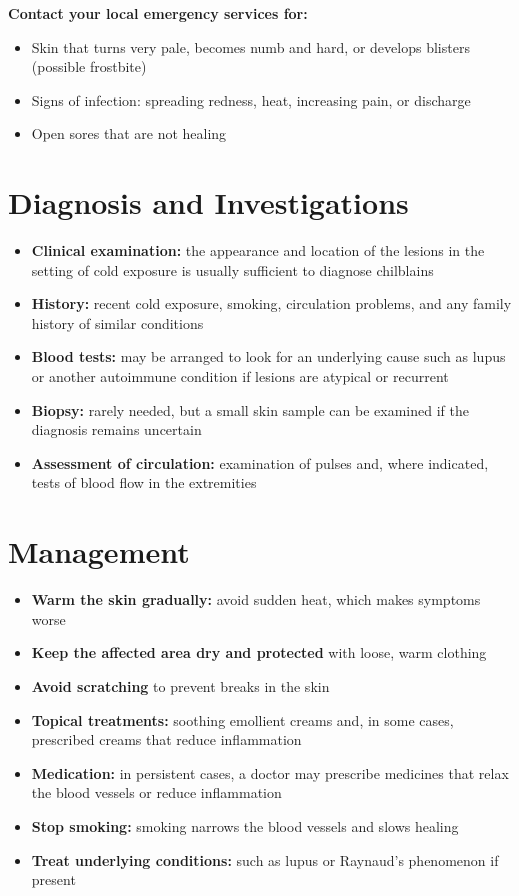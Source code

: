 \medskip
\textbf{Contact your local emergency services for:}
\begin{itemize}
    \item Skin that turns very pale, becomes numb and hard, or develops blisters (possible frostbite)
    \item Signs of infection: spreading redness, heat, increasing pain, or discharge
    \item Open sores that are not healing
\end{itemize}

\section*{Diagnosis and Investigations}
\begin{itemize}
    \item \textbf{Clinical examination:} the appearance and location of the lesions in the setting of cold exposure is usually sufficient to diagnose chilblains
    \item \textbf{History:} recent cold exposure, smoking, circulation problems, and any family history of similar conditions
    \item \textbf{Blood tests:} may be arranged to look for an underlying cause such as lupus or another autoimmune condition if lesions are atypical or recurrent
    \item \textbf{Biopsy:} rarely needed, but a small skin sample can be examined if the diagnosis remains uncertain
    \item \textbf{Assessment of circulation:} examination of pulses and, where indicated, tests of blood flow in the extremities
\end{itemize}

\section*{Management}
\begin{itemize}
    \item \textbf{Warm the skin gradually:} avoid sudden heat, which makes symptoms worse
    \item \textbf{Keep the affected area dry and protected} with loose, warm clothing
    \item \textbf{Avoid scratching} to prevent breaks in the skin
    \item \textbf{Topical treatments:} soothing emollient creams and, in some cases, prescribed creams that reduce inflammation
    \item \textbf{Medication:} in persistent cases, a doctor may prescribe medicines that relax the blood vessels or reduce inflammation
    \item \textbf{Stop smoking:} smoking narrows the blood vessels and slows healing
    \item \textbf{Treat underlying conditions:} such as lupus or Raynaud's phenomenon if present
\end{itemize}

